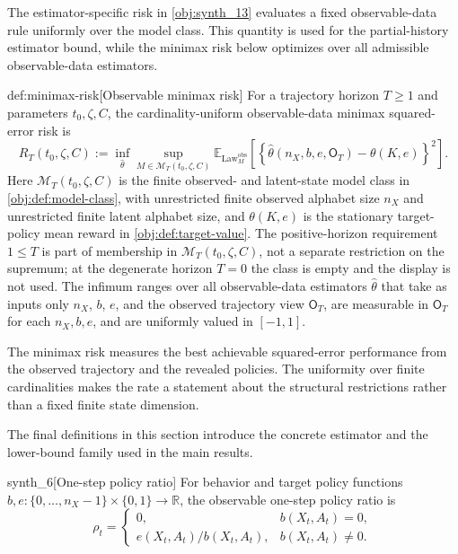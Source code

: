 \documentclass[11pt]{article}
\begin{document}
The estimator-specific risk in \cref{obj:synth_13} evaluates a fixed observable-data rule uniformly over the model class. This quantity is used for the partial-history estimator bound, while the minimax risk below optimizes over all admissible observable-data estimators.

\begin{definitionv}{def:minimax-risk}[Observable minimax risk]
For a trajectory horizon \(T\ge 1\) and parameters \(t_0,\zeta,C\), the cardinality-uniform observable-data minimax squared-error risk is
\[
R_T(t_0,\zeta,C)
:=
\inf_{\widehat\theta}
\sup_{M\in\mathcal M_T(t_0,\zeta,C)}
\mathbb E_{\operatorname{Law}^{\mathrm{obs}}_M}
\!\left[
\left\{\widehat\theta(n_X,b,e,\mathsf O_T)-\theta(K,e)\right\}^2
\right].
\]
Here \(\mathcal M_T(t_0,\zeta,C)\) is the finite observed- and latent-state model class in \cref{obj:def:model-class}, with unrestricted finite observed alphabet size \(n_X\) and unrestricted finite latent alphabet size, and \(\theta(K,e)\) is the stationary target-policy mean reward in \cref{obj:def:target-value}. The positive-horizon requirement \(1\le T\) is part of membership in \(\mathcal M_T(t_0,\zeta,C)\), not a separate restriction on the supremum; at the degenerate horizon \(T=0\) the class is empty and the display is not used. The infimum ranges over all observable-data estimators \(\widehat\theta\) that take as inputs only \(n_X\), \(b\), \(e\), and the observed trajectory view \(\mathsf O_T\), are measurable in \(\mathsf O_T\) for each \(n_X,b,e\), and are uniformly valued in \([-1,1]\).
\end{definitionv}

The minimax risk  measures the best achievable squared-error performance from the observed trajectory and the revealed policies. The uniformity over finite cardinalities makes the rate a statement about the structural restrictions rather than a fixed finite state dimension.

The final definitions in this section introduce the concrete estimator and the lower-bound family used in the main results.

\begin{definitionv}{synth_6}[One-step policy ratio]
For behavior and target policy functions \(b,e : \{0,\ldots,n_X-1\}\times\{0,1\}\to\mathbb R\), the observable one-step policy ratio is
\[
\rho_t
=
\begin{cases}
0, & b(X_t,A_t)=0,\\
e(X_t,A_t)/b(X_t,A_t), & b(X_t,A_t)\ne 0.
\end{cases}
\]
\end{definitionv}
\end{document}
